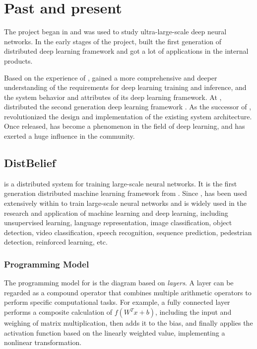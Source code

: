 \section{Past and present}
\begin{content}
The  project began in  and was used to study ultra-large-scale deep neural networks. In the early stages of the project,  built the first generation of distributed deep learning framework  and got a lot of applications in the  internal products.

Based on the experience of ,  gained a more comprehensive and deeper understanding of the requirements for deep learning training and inference, and the system behavior and attributes of its deep learning framework. At ,  distributed the second generation  deep learning framework \tf{}.  As the successor of , \tf{} revolutionized the design and implementation of the existing system architecture.  Once released, \tf{} has become a phenomenon in the field of deep learning, and has exerted a huge influence in the community.


\subsection{DistBelief}
 is a distributed system for training large-scale neural networks. It is the first generation distributed machine learning framework from . Since ,  has been used extensively within  to train large-scale neural networks and is widely used in the research and application of machine learning and deep learning, including unsupervised learning, language representation, image classification, object detection, video classification, speech recognition, sequence prediction, pedestrian detection, reinforced learning, etc.


\subsubsection{Programming Model}
The programming model for  is the  diagram based on \emph{layers}. A layer can be regarded as a compound operator that combines multiple arithmetic operators to perform specific computational tasks. For example, a fully connected layer performs a composite calculation of $f({W^T}x + b)$, including the  input and weighing of matrix multiplication, then adds it to the bias, and finally applies the activation function based on the linearly weighted value, implementing a nonlinear transformation.



\end{content}

